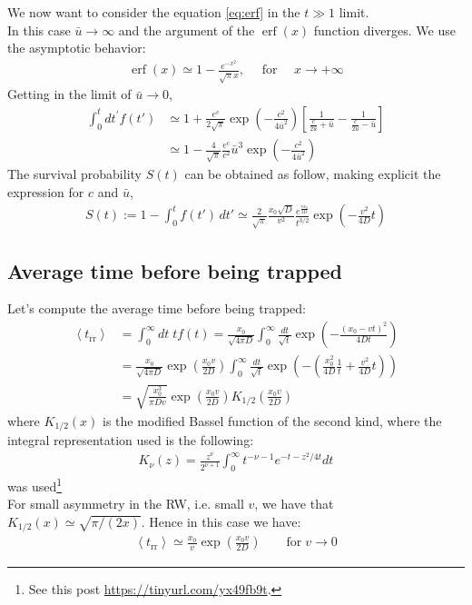 \documentclass[4apaper,11pt,fleqn]{article}
\theoremstyle{remark}
\theoremstyle{definition}
\begin{document}
We now want to consider the equation \eqref{eq:erf} in the $t \gg 1$ limit.\\
In this case $\bar{u}\rightarrow \infty$ and the argument of the $\operatorname{erf}(x)$ function diverges. We use the asymptotic behavior:
\begin{align*}
  \operatorname{erf}(x) \simeq 1-\frac{e^{-x^{2}}}{\sqrt{\pi} x}, \quad \text { for } \quad x \rightarrow+\infty
\end{align*}
Getting in the limit of $\bar{u} \rightarrow 0$,
\begin{align*}
 \int_{0}^{t} d t^{\prime} f(t') & \simeq 1+\frac{e^{c}}{2 \sqrt{\pi}} \exp \left(-\frac{c^{2}}{4 \bar{u}^{2}}\right)\left[\frac{1}{\frac{c}{2 \bar{u}}+\bar{u}}-\frac{1}{\frac{c}{2 \bar{u}}-\bar{u}}\right] \\ & \simeq 1-\frac{4}{\sqrt{\pi}} \frac{e^{c}}{c^{2}} \bar{u}^{3} \exp \left(-\frac{c^{2}}{4 \bar{u}^{2}}\right)
\end{align*}
The survival probability $S(t)$ can be obtained as follow, making explicit the expression for $c$ and $\bar{u}$,
\begin{align*}
  S(t) := 1- \int_0^t f(t') \, dt' \simeq \frac{2}{\sqrt{\pi}} \frac{x_{0} \sqrt{D}}{v^{2}} \frac{e^{\frac{v x_{0}}{2 D}}}{t^{3 / 2}} \exp \left(-\frac{v^{2}}{4 D} t\right)
\end{align*}

\subsection{Average time before being trapped}
\label{sebsec:t_trapp}
Let's compute the average time before being trapped:
\begin{align*}
  \left\langle t_{\mathrm{rr}}\right\rangle &=\int_{0}^{\infty} dt\; t f(t)=\frac{x_{0}}{\sqrt{4 \pi D}} \int_{0}^{\infty} \frac{d t}{\sqrt{t}} \exp \left(-\frac{\left(x_{0}-v t\right)^{2}}{4 D t}\right) \\ &=\frac{x_{0}}{\sqrt{4 \pi D}} \exp \left(\frac{x_{0} v}{2 D}\right) \int_{0}^{\infty} \frac{d t}{\sqrt{t}} \exp \left(-\left(\frac{x_{0}^{2}}{4 D} \frac{1}{t}+\frac{v^{2}}{4 D} t\right)\right) \\ &=\sqrt{\frac{x_{0}^{3}}{\pi D v}} \exp \left(\frac{x_{0} v}{2 D}\right) K_{1 / 2}\left(\frac{x_{0} v}{2 D}\right)
\end{align*}
where $K_{1 / 2}(x)$ is the modified Bassel function of the second kind, where the integral representation used is the following:
\begin{align*}
  K_{\nu}(z)=\frac{z^{\nu}}{2^{\nu+1}} \int_{0}^{\infty} t^{-\nu-1} e^{-t-z^{2} / 4 t} d t
\end{align*}
was used\footnote{See this post \url{https://tinyurl.com/yx49fb9t}.}\\
For small asymmetry in the RW, i.e. small $v$, we have that $K_{1/2}(x) \simeq \sqrt{\pi/(2x)}$. Hence in this case we have:
\begin{align}
  \label{eq:trr}
  \boxed{\left\langle t_{\mathrm{rr}}\right\rangle \simeq \frac{x_0}{v} \exp \left( \frac{x_0v}{2D} \right)} \qquad \text{for} \; v \rightarrow 0
\end{align}
\end{document}
